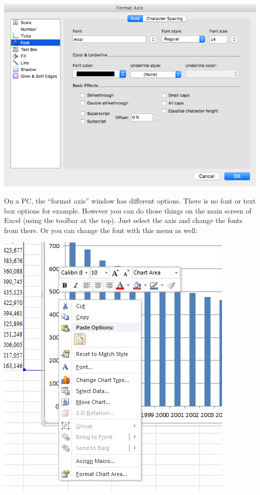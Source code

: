 \documentclass[
]{book}
\begin{document}
\includegraphics{imgs/desc_viz_9.png}

On a PC, the ``format axis'' window has different options. There is no font or text box options for example. However you can do those things on the main screen of Excel (using the toolbar at the top). Just select the axis and change the fonts from there. Or you can change the font with this menu as well:

\includegraphics{imgs/pc_change_font.jpg}
\end{document}
